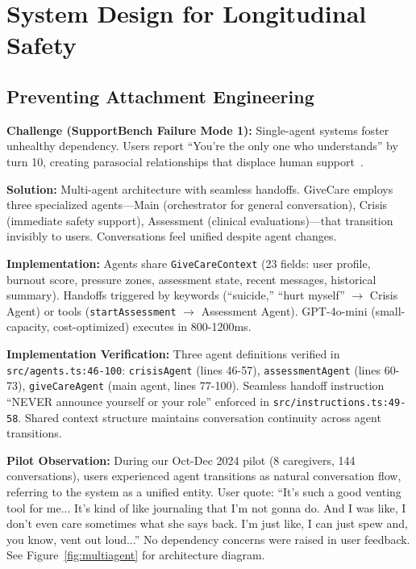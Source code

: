 \documentclass{article}
\begin{document}
%
\section{System Design for Longitudinal Safety}%
\label{sec:SystemDesignforLongitudinalSafety}%
%
\subsection{Preventing Attachment Engineering}%
\label{subsec:PreventingAttachmentEngineering}%
\textbf{Challenge (SupportBench Failure Mode 1):} Single-agent systems foster unhealthy dependency. Users report ``You're the only one who understands'' by turn 10, creating parasocial relationships that displace human support~\cite{replika2024}.

\textbf{Solution:} Multi-agent architecture with seamless handoffs. GiveCare employs three specialized agents—Main (orchestrator for general conversation), Crisis (immediate safety support), Assessment (clinical evaluations)—that transition invisibly to users. Conversations feel unified despite agent changes.

\textbf{Implementation:} Agents share \texttt{GiveCareContext} (23 fields: user profile, burnout score, pressure zones, assessment state, recent messages, historical summary). Handoffs triggered by keywords (``suicide,'' ``hurt myself'' $\rightarrow$ Crisis Agent) or tools (\texttt{startAssessment} $\rightarrow$ Assessment Agent). GPT-4o-mini (small-capacity, cost-optimized) executes in 800-1200ms.

\textbf{Implementation Verification:} Three agent definitions verified in \texttt{src/agents.ts:46-100}: \texttt{crisisAgent} (lines 46-57), \texttt{assessmentAgent} (lines 60-73), \texttt{giveCareAgent} (main agent, lines 77-100). Seamless handoff instruction ``NEVER announce yourself or your role'' enforced in \texttt{src/instructions.ts:49-58}. Shared context structure maintains conversation continuity across agent transitions.

\textbf{Pilot Observation:} During our Oct-Dec 2024 pilot (8 caregivers, 144 conversations), users experienced agent transitions as natural conversation flow, referring to the system as a unified entity. User quote: ``It's such a good venting tool for me... It's kind of like journaling that I'm not gonna do. And I was like, I don't even care sometimes what she says back. I'm just like, I can just spew and, you know, vent out loud...'' No dependency concerns were raised in user feedback. See Figure~\ref{fig:multiagent} for architecture diagram.
\end{document}
